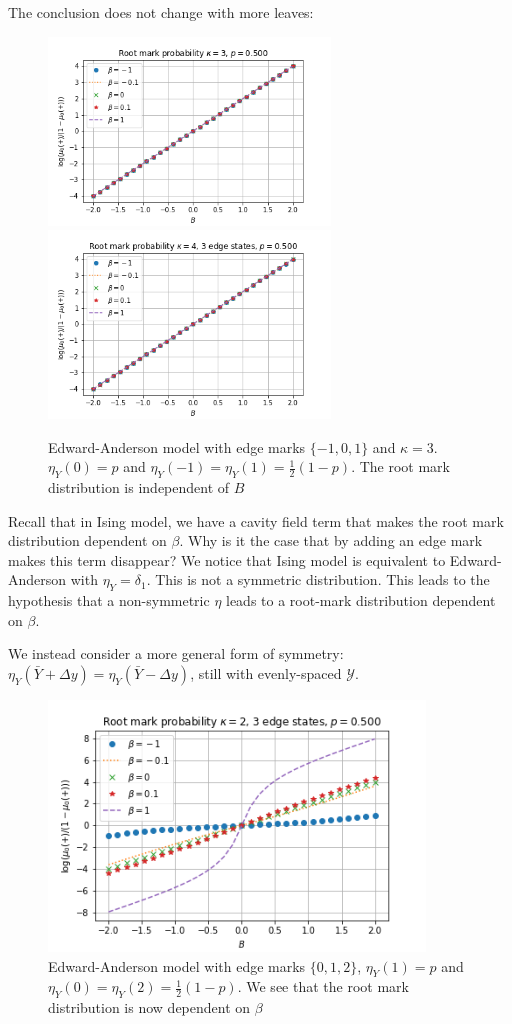 \documentclass[12pt]{article}
\numberwithin{equation}{section}
\begin{document}
\newpage
The conclusion does not change with more leaves:
\begin{figure}[h]
    \centering
    \includegraphics[width=7.5cm]{img/EA_x0_B_logi_kappa_3_3s_p=0.50.png}
    \includegraphics[width=7.5cm]{img/EA_x0_B_logi_kappa_4_3s_p=0.50.png}
    \caption{Edward-Anderson model with edge marks $\{-1, 0, 1\}$ and $\kappa=3$. $\eta_Y(0)=p$ and $\eta_Y(-1)=\eta_Y(1)=\frac12(1-p)$. The root mark distribution is independent of $B$}
    \label{Fig.EA-RM-k3-3s}
\end{figure}

Recall that in Ising model, we have a cavity field term that makes the root mark distribution dependent on $\beta$. Why is it the case that by adding
an edge mark makes this term disappear? We notice that Ising model is equivalent to Edward-Anderson with $\eta_Y=\delta_1$. This is not a symmetric
distribution. This leads to the hypothesis that a non-symmetric $\eta$ leads to a root-mark distribution dependent on $\beta$.

We instead consider a more general form of symmetry: $\eta_Y(\bar{Y}+\Delta y) = \eta_Y(\bar{Y}-\Delta y)$, still with evenly-spaced $\mathcal{Y}$.
\begin{figure}[h]
    \centering
    \includegraphics[width=10cm]{img/EA_x0_B_logi_kappa_2_3s_p=0.50_symF.png}
    \caption{Edward-Anderson model with edge marks $\{0, 1, 2\}$, $\eta_Y(1)=p$ and $\eta_Y(0)=\eta_Y(2)=\frac12(1-p)$. We see that the root mark distribution is now dependent on $\beta$}
    \label{Fig.EA-RM-k2-3s-asym}
\end{figure}
\end{document}
